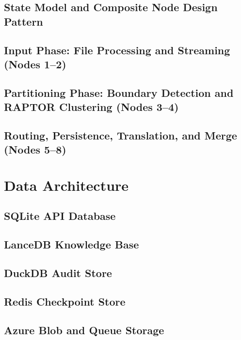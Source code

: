 \documentclass[12pt,a4paper]{report}
\begin{document}
  \subsection{State Model and Composite Node Design Pattern}
  \label{subsec:state-model}

  \subsection{Input Phase: File Processing and Streaming (Nodes 1--2)}
  \label{subsec:nodes-input}

  \subsection{Partitioning Phase: Boundary Detection and RAPTOR Clustering (Nodes 3--4)}
  \label{subsec:nodes-partition}

  \subsection{Routing, Persistence, Translation, and Merge (Nodes 5--8)}
  \label{subsec:nodes-routing-merge}

\section{Data Architecture}
\label{sec:data-architecture}

  \subsection{SQLite API Database}
  \label{subsec:sqlite-schema}

  \subsection{LanceDB Knowledge Base}
  \label{subsec:lancedb-schema}

  \subsection{DuckDB Audit Store}
  \label{subsec:duckdb-schema}

  \subsection{Redis Checkpoint Store}
  \label{subsec:redis-schema}

  \subsection{Azure Blob and Queue Storage}
  \label{subsec:azure-storage-schema}
\end{document}
